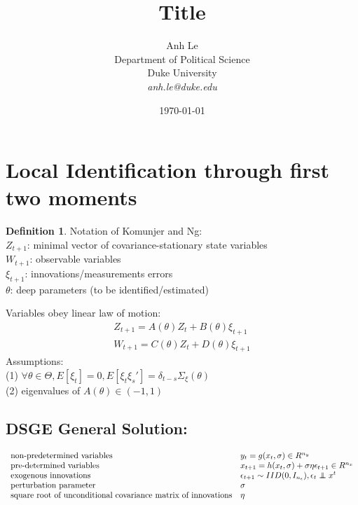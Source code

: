 \documentclass[10pt]{article}
\numberwithin{equation}{section}
\theoremstyle{definition}
\newtheorem{definition}{Definition}[section]
\theoremstyle{remark}
\newcommand\indep{\protect\mathpalette{\protect\independenT}{\perp}}
\def\independenT#1#2{\mathrel{\rlap{$#1#2$}\mkern2mu{#1#2}}}
\begin{document}
\title{Title}
\author{Anh Le\\Department of Political Science\\Duke University\\ \textit{anh.le@duke.edu}}
\date{\today\\}
\maketitle

\section{Local Identification through first two moments}

\begin{definition}{Notation of Komunjer and Ng:}\\
$Z_{t+1}$: minimal vector of covariance-stationary state variables\\
 $W_{t+1}$: observable variables\\
$\xi_{t+1}$: innovations/measurements errors\\
$\theta$: deep parameters (to be identified/estimated)\end{definition}
Variables obey linear law of motion:
\begin{eqnarray}Z_{t+1} = A(\theta ) Z_t + B(\theta )\xi_{t+1}\\
W_{t+1} = C(\theta ) Z_t + D(\theta )\xi_{t+1}\end{eqnarray}
Assumptions:\\
(1) $\forall \theta \in \Theta , E[\xi_t] =0, E[\xi_t\xi_s'] = \delta_{t-s}\Sigma_\xi (\theta)$\\
(2) eigenvalues of $A(\theta ) \in (-1,1)$\\

\subsection{DSGE General Solution:}
\begin{eqnarray}\begin{array}{l l} \text{non-predetermined variables } & y_t = g(x_t,\sigma ) \in R^{n_y}\\
\text{pre-determined variables } & x_{t+1} = h(x_t ,\sigma ) + \sigma \eta \epsilon_{t+1} \in R^{n_x}\\
\text{exogenous innovations } & \epsilon_{t+1} \sim IID(0,I_{n_\epsilon}), \epsilon_t \indep x^t\\
\text{perturbation parameter} & \sigma \\
\text{square root of unconditional covariance matrix of innovations} & \eta \\
 \end{array}\end{eqnarray}\\
\end{document}
